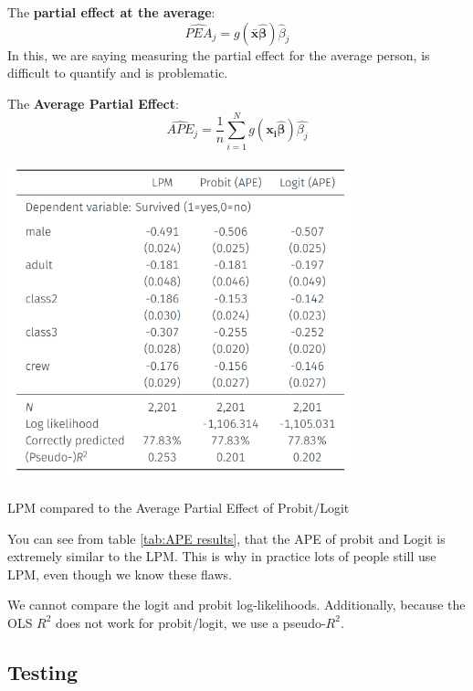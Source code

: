 \documentclass[11pt]{article}
\begin{document}
The \textbf{partial effect at the average}:
\[\widehat{PEA}_j = g(\boldsymbol{\bar{x}\hat{\beta}})\hat{\beta}_j\]
In this, we are saying measuring the partial effect for the average person, is difficult to quantify and is problematic.

The \textbf{Average Partial Effect}:
\[\widehat{APE}_j = \dfrac{1}{n}\sum_{i=1}^N g(\boldsymbol{x_i\hat{\beta}})\hat{\beta_j}\]

\begin{table}[h]
    \centering
    \includegraphics[width=10cm]{photos/APE example.png}
    \caption{LPM compared to the Average Partial Effect of Probit/Logit}
    \label{tab:APE results}
\end{table}

You can see from table \ref{tab:APE results}, that the APE of probit and Logit is extremely similar to the LPM. This is why in practice lots of people still use LPM, even though we know these flaws.

\begin{note}
    We cannot compare the logit and probit log-likelihoods. Additionally, because the OLS $R^2$ does not work for probit/logit, we use a pseudo-$R^2$.
\end{note}

\subsection{Testing}
\end{document}

